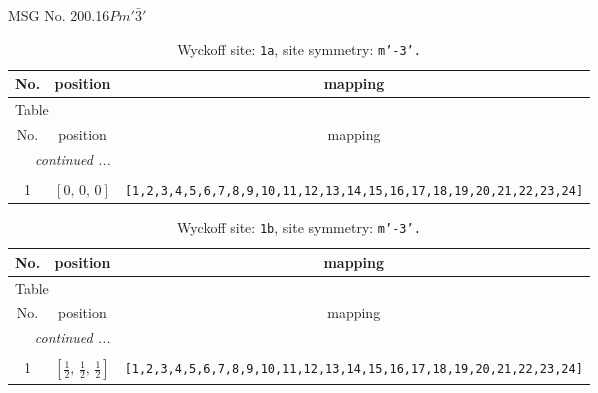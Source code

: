 \documentclass[fleqn,8pt]{jsarticle}
\begin{document}
\setcounter{MaxMatrixCols}{32}

\renewcommand{\tablename}{Table~}
\renewcommand{\figurename}{Figure~}
\begin{center}
\LARGE
MSG No. 200.16\quad$Pm'\bar{3}'$
\end{center}
\renewcommand{\arraystretch}{1.2}
\begin{longtable}{ccc}
\caption{Wyckoff site: {\tt 1a}, site symmetry: {\tt m'-3'.}}
 \\
 \hline \hline
No. & position & mapping \\ \hline \endfirsthead

\multicolumn{2}{l}{\tablename\ \thetable{}} \\
 \hline \hline
No. & position & mapping \\ \hline \endhead

 \hline \hline
\multicolumn{2}{r}{\footnotesize\it continued ...} \\ \endfoot

 \hline \hline
\multicolumn{2}{r}{} \\ \endlastfoot

1 & $\left[ 0,\, 0,\, 0 \right]$ & {\tt [1,2,3,4,5,6,7,8,9,10,11,12,13,14,15,16,17,18,19,20,21,22,23,24]} \\
\end{longtable}
\renewcommand{\arraystretch}{1.2}
\begin{longtable}{ccc}
\caption{Wyckoff site: {\tt 1b}, site symmetry: {\tt m'-3'.}}
 \\
 \hline \hline
No. & position & mapping \\ \hline \endfirsthead

\multicolumn{2}{l}{\tablename\ \thetable{}} \\
 \hline \hline
No. & position & mapping \\ \hline \endhead

 \hline \hline
\multicolumn{2}{r}{\footnotesize\it continued ...} \\ \endfoot

 \hline \hline
\multicolumn{2}{r}{} \\ \endlastfoot

1 & $\left[ \frac{1}{2},\, \frac{1}{2},\, \frac{1}{2} \right]$ & {\tt [1,2,3,4,5,6,7,8,9,10,11,12,13,14,15,16,17,18,19,20,21,22,23,24]} \\
\end{longtable}
\renewcommand{\arraystretch}{1.2}
\end{document}
